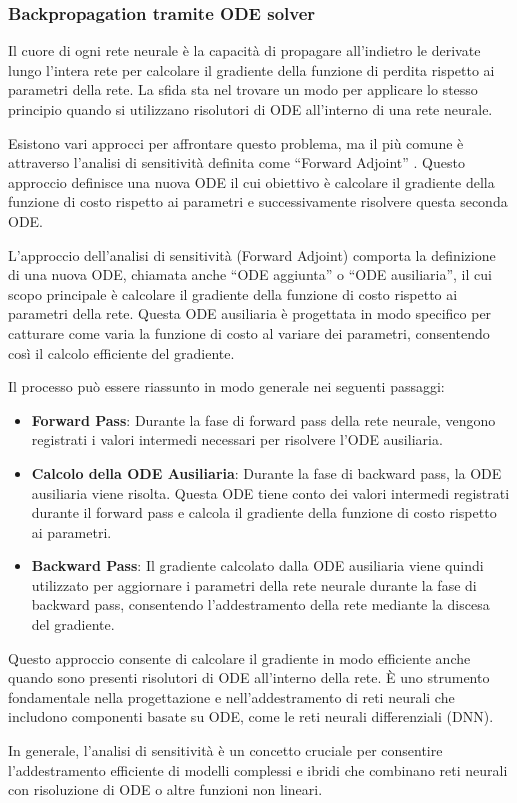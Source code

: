 \newpage

\subsubsection{Backpropagation tramite ODE solver}

Il cuore di ogni rete neurale è la capacità di propagare all'indietro 
le derivate lungo l'intera rete per calcolare il gradiente della 
funzione di perdita rispetto ai parametri della rete. La sfida sta nel 
trovare un modo per applicare lo stesso principio quando si utilizzano 
risolutori di ODE all'interno di una rete neurale.

Esistono vari approcci per affrontare questo problema, ma il più comune 
è attraverso l'analisi di sensitività definita come ``Forward Adjoint'' \cite{NEURIPS2018_69386f6b} \cite{WANG20131}. Questo approccio 
definisce una nuova ODE il cui obiettivo è calcolare il gradiente della 
funzione di costo rispetto ai parametri e successivamente risolvere 
questa seconda ODE.

L'approccio dell'analisi di sensitività (Forward Adjoint) comporta la 
definizione di una nuova ODE, chiamata anche ``ODE aggiunta'' o 
``ODE ausiliaria'', il cui scopo principale è calcolare il gradiente 
della funzione di costo rispetto ai parametri della rete. 
Questa ODE ausiliaria è progettata in modo specifico per catturare 
come varia la funzione di costo al variare dei parametri, 
consentendo così il calcolo efficiente del gradiente.

Il processo può essere riassunto in modo generale nei seguenti passaggi:

\begin{itemize}
    \item \textbf{Forward Pass}: Durante la fase di forward pass 
    della rete neurale, vengono registrati i valori intermedi 
    necessari per risolvere l'ODE ausiliaria.
    \item \textbf{Calcolo della ODE Ausiliaria}: Durante la fase di 
    backward pass, la ODE ausiliaria viene risolta. 
    Questa ODE tiene conto dei valori intermedi registrati durante 
    il forward pass e calcola il gradiente della funzione di costo 
    rispetto ai parametri.
    \item \textbf{Backward Pass}: Il gradiente calcolato dalla ODE 
    ausiliaria viene quindi utilizzato per aggiornare i parametri 
    della rete neurale durante la fase di backward pass, consentendo 
    l'addestramento della rete mediante la discesa del gradiente.
\end{itemize}

Questo approccio consente di calcolare il gradiente 
in modo efficiente anche quando sono presenti risolutori di ODE 
all'interno della rete. È uno strumento fondamentale nella progettazione 
e nell'addestramento di reti neurali che includono componenti basate 
su ODE, come le reti neurali differenziali (DNN).

In generale, l'analisi di sensitività è un concetto cruciale per 
consentire l'addestramento efficiente di modelli complessi e ibridi 
che combinano reti neurali con risoluzione di ODE o altre funzioni non 
lineari.